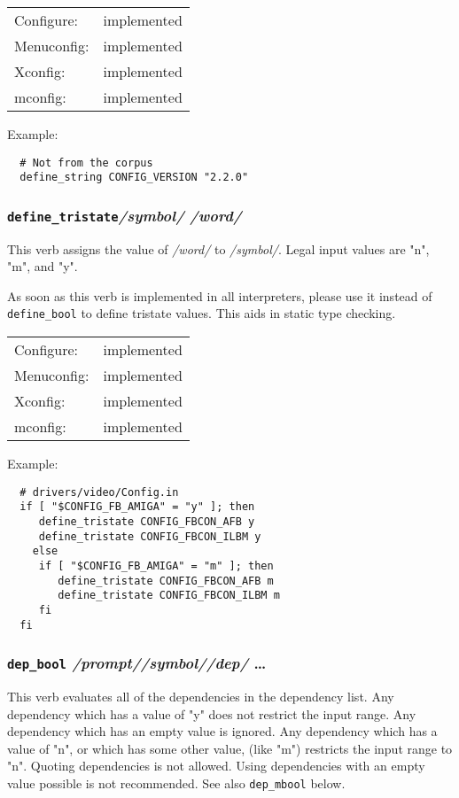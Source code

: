 \begin{tabular}{ll}
Configure:  &implemented\\
Menuconfig: &implemented\\
Xconfig:    &implemented\\
mconfig:    &implemented\\
\end{tabular}

Example:
{\small\begin{verbatim}
  # Not from the corpus
  define_string CONFIG_VERSION "2.2.0"
\end{verbatim}}



\subsubsection{\texttt{define\_tristate}\quad \textit{/symbol/} \quad\textit{/word/}}

This verb assigns the value of \textit{/word/} to \textit{/symbol/}.  
Legal input values are "n", "m", and "y".

As soon as this verb is implemented in all interpreters, please use it
instead of \texttt{define\_bool} to define tristate values.  This aids in static
type checking.

\begin{tabular}{ll}
Configure:  &implemented\\
Menuconfig: &implemented\\
Xconfig:    &implemented\\
mconfig:    &implemented\\
\end{tabular}

Example:
{\small\begin{verbatim}
  # drivers/video/Config.in
  if [ "$CONFIG_FB_AMIGA" = "y" ]; then
     define_tristate CONFIG_FBCON_AFB y
     define_tristate CONFIG_FBCON_ILBM y
    else
     if [ "$CONFIG_FB_AMIGA" = "m" ]; then
        define_tristate CONFIG_FBCON_AFB m
        define_tristate CONFIG_FBCON_ILBM m
     fi
  fi
\end{verbatim}}



\subsubsection{\texttt{dep\_bool} \quad\textit{/prompt/}\quad \textit{/symbol/}\quad \textit{/dep/} \quad\dots}

This verb evaluates all of the dependencies in the dependency list.
Any dependency which has a value of "y" does not restrict the input
range.  Any dependency which has an empty value is ignored.
Any dependency which has a value of "n", or which has some other value,
(like "m") restricts the input range to "n".  Quoting dependencies is not
allowed. Using dependencies with an empty value possible is not
recommended.  See also \texttt{dep\_mbool} below.

